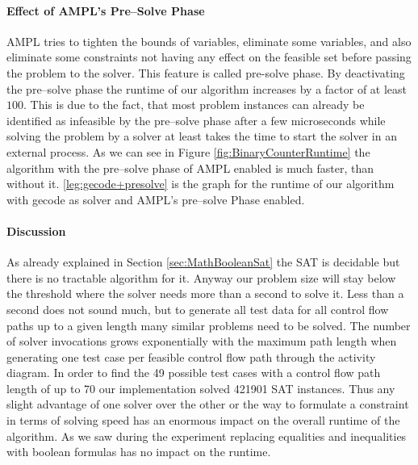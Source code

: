 \paragraph{Effect of AMPL's Pre--Solve Phase}
AMPL tries to tighten the bounds of variables, eliminate some variables, and also eliminate some constraints not having any effect on the feasible set before passing the problem to the solver. This feature is called pre-solve phase. %
By deactivating the pre--solve phase the runtime of our algorithm increases by a factor of at least $100$. This is due to the fact, that most problem instances can already be identified as infeasible by the pre--solve phase after a few microseconds while solving the problem by a solver at least takes the time to start the solver in an external process. %
As we can see in Figure \ref{fig:BinaryCounterRuntime} the algorithm with the pre--solve phase of AMPL enabled is much faster, than without it. \ref{leg:gecode+presolve} is the graph for the runtime of our algorithm with gecode as solver and AMPL's pre--solve Phase enabled.
\paragraph{Discussion}
As already explained in Section \ref{sec:MathBooleanSat} the SAT is decidable but there is no tractable algorithm for it. Anyway our problem size will stay below the threshold where the solver needs more than a second to solve it. Less than a second does not sound much, but to generate all test data for all control flow paths up to a given length many similar problems need to be solved. The number of solver invocations grows exponentially with the maximum path length when generating one test case per feasible control flow path through the activity diagram. In order to find the 49 possible test cases with a control flow path length of up to 70 our implementation solved 421901 SAT instances. Thus any slight advantage of one solver over the other or the way to formulate a constraint in terms of solving speed has an enormous impact on the overall runtime of the algorithm. As we saw during the experiment replacing equalities and inequalities with boolean formulas has no impact on the runtime. 
